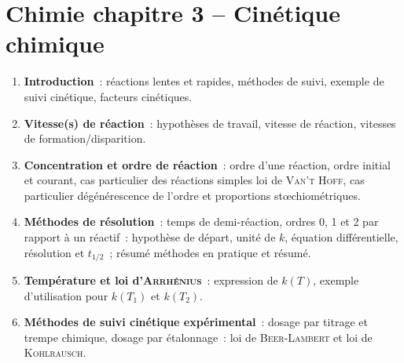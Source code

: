 \documentclass[a4paper, 12pt, final, garamond]{book}
\begin{document}
\section*{Chimie chapitre 3 -- Cinétique chimique}
\begin{enumerate}[label=\Roman*]
    \item \textbf{Introduction}~: réactions lentes et rapides, méthodes de
        suivi, exemple de suivi cinétique, facteurs cinétiques.
    \item \textbf{Vitesse(s) de réaction}~: hypothèses de travail, vitesse de
        réaction, vitesses de formation/disparition.
    \item \textbf{Concentration et ordre de réaction}~: ordre d'une réaction,
        ordre initial et courant, cas particulier des réactions simples loi de
        \textsc{Van't Hoff}, cas particulier dégénérescence de l'ordre et
        proportions stœchiométriques.
    \item \textbf{Méthodes de résolution}~: temps de demi-réaction, ordres 0, 1
        et 2 par rapport à un réactif~: hypothèse de départ, unité de $k$,
        équation différentielle, résolution et $t_{1/2}$~; résumé méthodes en
        pratique et résumé.
    \item \textbf{Température et loi d'\textsc{Arrhénius}}~: expression de
        $k(T)$, exemple d'utilisation pour $k(T_1)$ et $k(T_2)$.
    \item \textbf{Méthodes de suivi cinétique expérimental}~: dosage par
        titrage et trempe chimique, dosage par étalonnage~: loi de
        \textsc{Beer-Lambert} et loi de \textsc{Kohlrausch}.
\end{enumerate}
\end{document}
